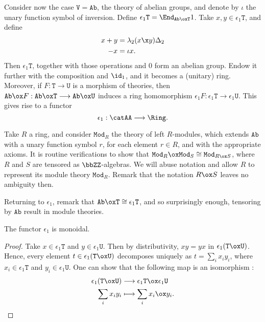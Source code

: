 \documentclass[a4paper, 12pt]{article}
\newcommand{\theory}{\mathtt}
\begin{document}
Consider now the case $\theory{V} = \theory{Ab}$, the theory of abelian groups, and denote by $\iota$ the unary function symbol of inversion. Define $\epsilon_1 \theory{T} = \End_{\theory{Ab} \ox \theory{T}} 1$. Take $x, y \in \epsilon_1 \theory{T}$, and define
\begin{align*}
    x + y     &= \lambda_2 (x \x y) \Delta_2 \\
    - x       &= \iota x .
\end{align*}
Then $\epsilon_1 \theory{T}$, together with those operations and $0$ form an abelian group. Endow it further with the composition and $\id_1$, and it becomes a (unitary) ring. Moreover, if $F : \theory{T} \longrightarrow \theory{U}$ is a morphism of theories, then $\theory{Ab} \ox F : \theory{Ab} \ox \theory{T} \longrightarrow \theory{Ab} \ox \theory{U}$ induces a ring homomorphism $\epsilon_1 F : \epsilon_1 \theory{T} \longrightarrow \epsilon_1 \theory{U}$. This gives rise to a functor
\[ \epsilon_1 : \catAA \longrightarrow \Ring . \]

Take $R$ a ring, and consider $\theory{Mod}_R$ the theory of left $R$-modules, which extends $\theory{Ab}$ with a unary function symbol $r$, for each element $r \in R$, and with the appropriate axioms. It is routine verifications to show that $\theory{Mod}_R \ox \theory{Mod}_S \cong \theory{Mod}_{R \ox S}$, where $R$ and $S$ are tensored as $\bbZZ$-algebras. We will abuse notation and allow $R$ to represent its module theory $\theory{Mod}_R$. Remark that the notation $R \ox S$ leaves no ambiguity then.

Returning to $\epsilon_1$, remark that $\theory{Ab} \ox \theory{T} \cong \epsilon_1 \theory{T}$, and so surprisingly enough, tensoring by $\theory{Ab}$ result in module theories.

\begin{proposition}
    The functor $\epsilon_1$ is monoidal.
\end{proposition}
\begin{proof}
    Take $x \in \epsilon_1 \theory{T}$ and $y \in \epsilon_1 \theory{U}$. Then by distributivity, $x y = y x$ in $\epsilon_1 ( \theory{T} \ox \theory{U} )$. Hence, every element $t \in \epsilon_1 ( \theory{T} \ox \theory{U} )$ decomposes uniquely as $t = \sum_i x_i y_i$, where $x_i \in \epsilon_1 \theory{T}$ and $y_i \in \epsilon_1 \theory{U}$. One can show that the following map is an isomorphism :
    \begin{align*}
        \epsilon_1 ( \theory{T} \ox \theory{U} ) &\longrightarrow \epsilon_1 \theory{T} \ox \epsilon_1 \theory{U} \\
        \sum_i x_i y_i &\longmapsto \sum_i x_i \ox y_i .
    \end{align*}
\end{proof}
\end{document}
